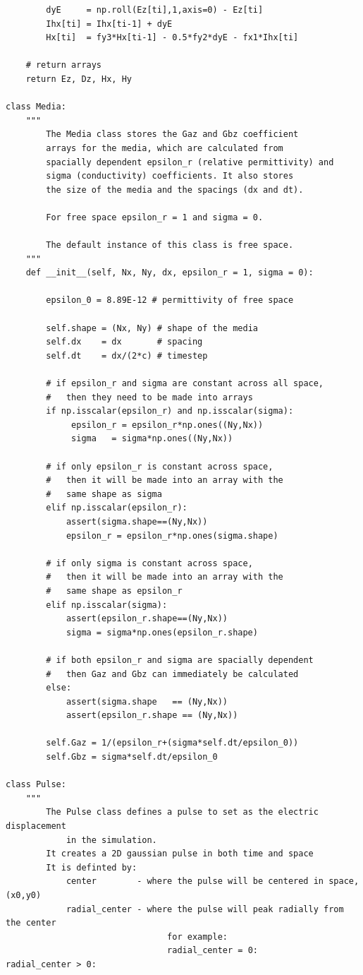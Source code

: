 \documentclass[12pt,twocolumn]{article}
\begin{document}
\begin{verbatim}
        dyE     = np.roll(Ez[ti],1,axis=0) - Ez[ti]
        Ihx[ti] = Ihx[ti-1] + dyE
        Hx[ti]  = fy3*Hx[ti-1] - 0.5*fy2*dyE - fx1*Ihx[ti]

    # return arrays
    return Ez, Dz, Hx, Hy

class Media:
    """
        The Media class stores the Gaz and Gbz coefficient
        arrays for the media, which are calculated from
        spacially dependent epsilon_r (relative permittivity) and
        sigma (conductivity) coefficients. It also stores
        the size of the media and the spacings (dx and dt).

        For free space epsilon_r = 1 and sigma = 0.

        The default instance of this class is free space.
    """
    def __init__(self, Nx, Ny, dx, epsilon_r = 1, sigma = 0):

        epsilon_0 = 8.89E-12 # permittivity of free space

        self.shape = (Nx, Ny) # shape of the media
        self.dx    = dx       # spacing
        self.dt    = dx/(2*c) # timestep

        # if epsilon_r and sigma are constant across all space,
        #   then they need to be made into arrays
        if np.isscalar(epsilon_r) and np.isscalar(sigma):
             epsilon_r = epsilon_r*np.ones((Ny,Nx))
             sigma   = sigma*np.ones((Ny,Nx))

        # if only epsilon_r is constant across space,
        #   then it will be made into an array with the
        #   same shape as sigma
        elif np.isscalar(epsilon_r):
            assert(sigma.shape==(Ny,Nx))
            epsilon_r = epsilon_r*np.ones(sigma.shape)

        # if only sigma is constant across space,
        #   then it will be made into an array with the
        #   same shape as epsilon_r
        elif np.isscalar(sigma):
            assert(epsilon_r.shape==(Ny,Nx))
            sigma = sigma*np.ones(epsilon_r.shape)

        # if both epsilon_r and sigma are spacially dependent
        #   then Gaz and Gbz can immediately be calculated
        else:
            assert(sigma.shape   == (Ny,Nx))
            assert(epsilon_r.shape == (Ny,Nx))

        self.Gaz = 1/(epsilon_r+(sigma*self.dt/epsilon_0))
        self.Gbz = sigma*self.dt/epsilon_0

class Pulse:
    """
        The Pulse class defines a pulse to set as the electric displacement
            in the simulation.
        It creates a 2D gaussian pulse in both time and space
        It is definted by:
            center        - where the pulse will be centered in space, (x0,y0)
            radial_center - where the pulse will peak radially from the center
                                for example:
                                radial_center = 0:          radial_center > 0:


\end{verbatim}
\end{document}
